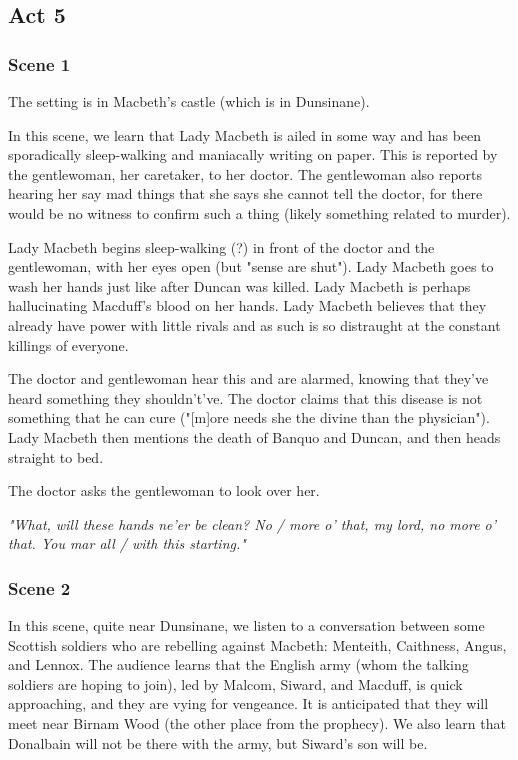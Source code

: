 \subsection{Act 5}

\subsubsection{Scene 1}

The setting is in Macbeth's castle (which is in Dunsinane).

In this scene, we learn that Lady Macbeth is ailed in some way and has been
sporadically sleep-walking and maniacally writing on paper. This is reported by
the gentlewoman, her caretaker, to her doctor. The gentlewoman also reports
hearing her say mad things that she says she cannot tell the doctor, for there
would be no witness to confirm such a thing (likely something related to
murder).

Lady Macbeth begins sleep-walking (?) in front of the doctor and the
gentlewoman, with her eyes open (but "sense are shut"). Lady Macbeth goes to
wash her hands just like after Duncan was killed. Lady Macbeth is perhaps
hallucinating Macduff's blood on her hands. Lady Macbeth believes that they
already have power with little rivals and as such is so distraught at the
constant killings of everyone.

The doctor and gentlewoman hear this and are alarmed, knowing that they've
heard something they shouldn't've. The doctor claims that this disease is not
something that he can cure ("[m]ore needs she the divine than the physician").
Lady Macbeth then mentions the death of Banquo and Duncan, and then heads
straight to bed.

The doctor asks the gentlewoman to look over her.

\textit{"What, will these hands ne'er be clean? No / more o' that, my lord, no more o' that. You mar all / with this starting."}

\subsubsection{Scene 2}

In this scene, quite near Dunsinane, we listen to a conversation between some
Scottish soldiers who are rebelling against Macbeth: Menteith, Caithness,
Angus, and Lennox. The audience learns that the English army (whom the talking
soldiers are hoping to join), led by Malcom, Siward, and Macduff, is quick
approaching, and they are vying for vengeance. It is anticipated that they will
meet near Birnam Wood (the other place from the prophecy). We also learn that
Donalbain will not be there with the army, but Siward's son will be.

